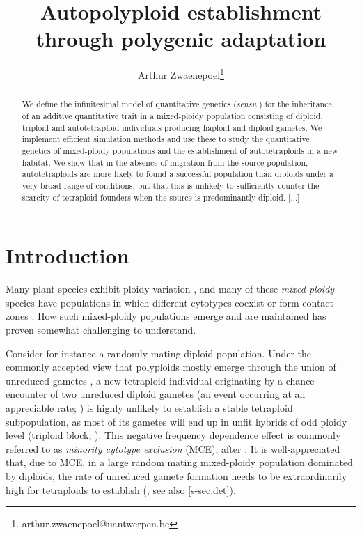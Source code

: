 \documentclass[12pt,a4paper]{article}
\begin{document}
\title{Autopolyploid establishment through polygenic adaptation}
\author[1]{Arthur Zwaenepoel\thanks{arthur.zwaenepoel@uantwerpen.be}}
\date{\vspace{-5ex}}
\maketitle
\begin{abstract}
We define the infinitesimal model of quantitative genetics (\textit{sensu}
\cite{barton2017}) for the inheritance of an additive quantitative trait in a
mixed-ploidy population consisting of diploid, triploid and autotetraploid
individuals producing haploid and diploid gametes.
We implement efficient simulation methods and use these to study the
quantitative genetics of mixed-ploidy populations and the establishment of
autotetraploids in a new habitat.
We show that in the absence of migration from the source population,
autotetraploids are more likely to found a successful population than diploids
under a very broad range of conditions, but that this is unlikely to
sufficiently counter the scarcity of tetraploid founders when the source is
predominantly diploid.
[...]
\end{abstract}

\section*{Introduction}


Many plant species exhibit ploidy variation
\citep{levin2002,soltis2007,rice2015}, and many of these \textit{mixed-ploidy}
species have populations in which different cytotypes coexist or form contact
zones \citep{kolar2017}.
How such mixed-ploidy populations emerge and are maintained has proven somewhat
challenging to understand.

Consider for instance a randomly mating diploid population.
Under the commonly accepted view that polyploids mostly emerge through the
union of unreduced gametes \citep{bretagnolle1995,herben2016,kreiner2017b}, a
new tetraploid individual originating by a chance encounter of two unreduced
diploid gametes (an event occurring at an appreciable rate; \cite{kreiner2017})
is highly unlikely to establish a stable tetraploid subpopulation, as most of
its gametes will end up in unfit hybrids of odd ploidy level (triploid block,
\cite{ramsey1998,kohler2010,brown2024}).
This negative frequency dependence effect is commonly referred to as
\textit{minority cytotype exclusion} (MCE), after \cite{levin1975}.
It is well-appreciated that, due to MCE, in a large random mating mixed-ploidy
population dominated by diploids, the rate of unreduced gamete formation needs
to be extraordinarily high for tetraploids to establish (\cite{felber1997}, see
also \cref{s-sec:det}).
\end{document}

